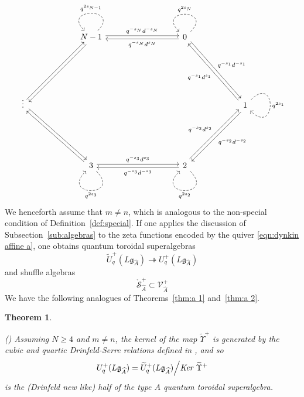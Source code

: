 \documentclass{amsart}
\newtheorem{theorem}[subsection]{Theorem}
\def\fg{{\mathfrak{g}}}
\def\CS{{\mathcal{S}}}
\def\CV{{\mathcal{V}}}
\def\tuwa{\widetilde{U}_q^+(L\fg_{\widehat{A}})}
\def\uwa{U_q^+(L\fg_{\widehat{A}})}
\def\oCS{\mathring{\CS}}
\begin{document}
\begin{equation}
\label{eqn:dynkin affine a}
\begin{tikzcd}[row sep=3em,column sep=3em]
&& {N-1} &&& {0} && \\ \\
\vdots &&&&&&& {1} \\ \\
&& {3} &&& {2}
\arrow["{q^{-s_N}d^{-s_N}}", shift left=2pt, from=1-3, to=1-6]
\arrow["{q^{-s_N}d^{s_N}}", shift left=2pt, from=1-6, to=1-3]
\arrow["{q^{-s_1}d^{-s_1}}", shift left=2pt, from=1-6, to=3-8]
\arrow["{q^{-s_1}d^{s_1}}", shift left=2pt, from=3-8, to=1-6]
\arrow[shift left=2pt, from=3-1, to=1-3]
\arrow[shift left=2pt, from=1-3, to=3-1]
\arrow["{q^{-s_2}d^{-s_2}}", shift left=2pt, from=3-8, to=5-6]
\arrow["{q^{-s_2}d^{s_2}}", shift left=2pt, from=5-6, to=3-8]
\arrow[shift left=2pt, from=5-3, to=3-1]
\arrow[shift left=2pt, from=3-1, to=5-3]
\arrow["{q^{-s_3}d^{-s_3}}", shift left=2pt, from=5-6, to=5-3]
\arrow["{q^{-s_3}d^{s_3}}",shift left=2pt, from=5-3, to=5-6]
\arrow["q^{2s_{N-1}}"', distance=4em, dashed, from=1-3, to=1-3, out=45, in=135]
\arrow["q^{2s_{N}}"', distance=4em, dashed, from=1-6, to=1-6, out=45, in=135]
\arrow["q^{2s_1}", distance=4.5em, dashed, from=3-8, to=3-8, out=45, in=315]
\arrow["q^{2s_2}", distance=4.5em, dashed, from=5-6, to=5-6, out=315, in=225]
\arrow["q^{2s_{3}}", distance=4.5em, dashed, from=5-3, to=5-3, out=315, in=225]
\end{tikzcd}
\end{equation}
We henceforth assume that $m\neq n$, which is analogous to the non-special condition of Definition~\ref{def:special}. If one applies the discussion of Subsection~\ref{sub:algebras} to the zeta functions encoded by the quiver \eqref{eqn:dynkin affine a}, one obtains quantum toroidal superalgebras
\[
\tuwa \twoheadrightarrow \uwa 
\]
and shuffle algebras 
\[
\oCS^+_{\widehat{A}} \subset \CV^+_{\widehat{A}}
\]
We have the following analogues of Theorems~\ref{thm:a 1} and~\ref{thm:a 2}.

\medskip 

\begin{theorem}
\label{thm:wa 1}
	
(\cite{NT}) Assuming $N \geq 4$ and $m \neq n$, the kernel of the map $\widetilde{\Upsilon}^+$ is generated by the cubic and quartic Drinfeld-Serre relations defined in \cite{BM}, and so
\[
\uwa = \tuwa \Big/ \emph{Ker } \widetilde{\Upsilon}^+
\]
is the (Drinfeld new like) half of the type $A$ quantum toroidal superalgebra. 
	
\end{theorem}
\end{document}
